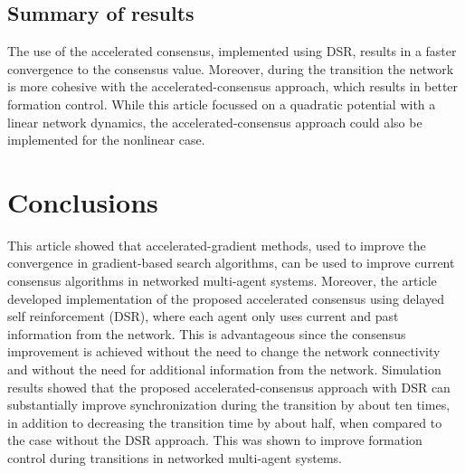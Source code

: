 \documentclass[conference]{IEEEtran}
\begin{document}
\subsection{Summary of results} 
The use of the accelerated consensus, implemented using DSR,  results in a faster convergence to the consensus value. Moreover, during the transition the network is more cohesive with the accelerated-consensus approach, which results in better formation control. 
While this article focussed on a quadratic potential with a linear network dynamics, the accelerated-consensus approach could also be implemented for the nonlinear case. 



\section{Conclusions}
\vspace{-0.01in}
This article showed that accelerated-gradient methods, used to improve the 
convergence in gradient-based search algorithms,  can be used to improve 
current consensus algorithms in networked multi-agent systems. 
Moreover, the article developed implementation of the proposed 
accelerated consensus  using delayed self reinforcement (DSR), 
where each agent only uses 
current and past information from the network. This is advantageous since the 
consensus improvement is achieved without the need to change the network connectivity 
and without the need for additional information from the network. 
Simulation results showed that the proposed accelerated-consensus approach with DSR can substantially improve synchronization during the transition by about ten times, in addition 
to decreasing the transition time by about half, 
when compared to the case without the DSR approach.
This was shown to improve formation control during transitions in networked 
multi-agent systems.



%
\end{document}
